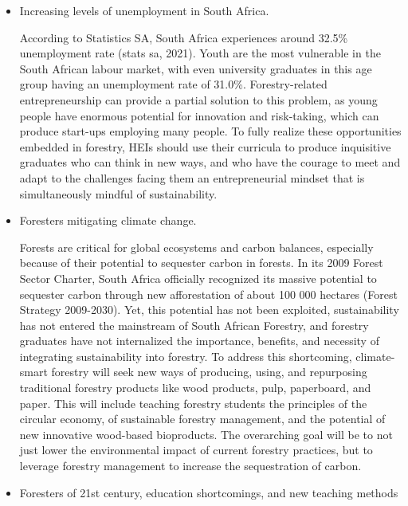 \documentclass[
  11pt,
]{article}
\begin{document}
\begin{itemize}
\item
  Increasing levels of unemployment in South Africa.

  According to Statistics SA, South Africa experiences around 32.5\%
  unemployment rate (stats sa, 2021). Youth are the most vulnerable in
  the South African labour market, with even university graduates in
  this age group having an unemployment rate of 31.0\%. Forestry-related
  entrepreneurship can provide a partial solution to this problem, as
  young people have enormous potential for innovation and risk-taking,
  which can produce start-ups employing many people. To fully realize
  these opportunities embedded in forestry, HEIs should use their
  curricula to produce inquisitive graduates who can think in new ways,
  and who have the courage to meet and adapt to the challenges facing
  them an entrepreneurial mindset that is simultaneously mindful of
  sustainability.
\item
  Foresters mitigating climate change.

  Forests are critical for global ecosystems and carbon balances,
  especially because of their potential to sequester carbon in forests.
  In its 2009 Forest Sector Charter, South Africa officially recognized
  its massive potential to sequester carbon through new afforestation of
  about 100 000 hectares (Forest Strategy 2009-2030). Yet, this
  potential has not been exploited, sustainability has not entered the
  mainstream of South African Forestry, and forestry graduates have not
  internalized the importance, benefits, and necessity of integrating
  sustainability into forestry. To address this shortcoming,
  climate-smart forestry will seek new ways of producing, using, and
  repurposing traditional forestry products like wood products, pulp,
  paperboard, and paper. This will include teaching forestry students
  the principles of the circular economy, of sustainable forestry
  management, and the potential of new innovative wood-based
  bioproducts. The overarching goal will be to not just lower the
  environmental impact of current forestry practices, but to leverage
  forestry management to increase the sequestration of carbon.
\item
  Foresters of 21st century, education shortcomings, and new teaching
  methods


\end{itemize}
\end{document}
